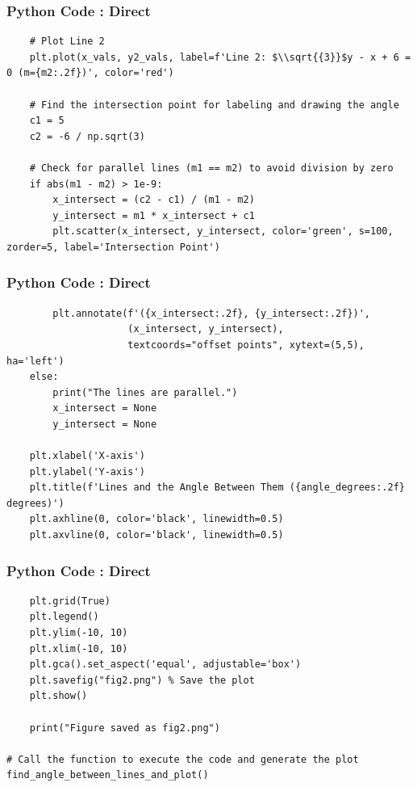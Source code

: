\documentclass{beamer}
\begin{document}
\begin{frame}[fragile]
\frametitle{Python Code : Direct}

\begin{lstlisting}
    # Plot Line 2
    plt.plot(x_vals, y2_vals, label=f'Line 2: $\\sqrt{{3}}$y - x + 6 = 0 (m={m2:.2f})', color='red')

    # Find the intersection point for labeling and drawing the angle
    c1 = 5
    c2 = -6 / np.sqrt(3)
    
    # Check for parallel lines (m1 == m2) to avoid division by zero
    if abs(m1 - m2) > 1e-9: 
        x_intersect = (c2 - c1) / (m1 - m2)
        y_intersect = m1 * x_intersect + c1
        plt.scatter(x_intersect, y_intersect, color='green', s=100, zorder=5, label='Intersection Point')
        \end{lstlisting}

\end{frame}
\begin{frame}[fragile]
\frametitle{Python Code : Direct}

\begin{lstlisting}
        plt.annotate(f'({x_intersect:.2f}, {y_intersect:.2f})', 
                     (x_intersect, y_intersect), 
                     textcoords="offset points", xytext=(5,5), ha='left')
    else:
        print("The lines are parallel.")
        x_intersect = None
        y_intersect = None

    plt.xlabel('X-axis')
    plt.ylabel('Y-axis')
    plt.title(f'Lines and the Angle Between Them ({angle_degrees:.2f} degrees)')
    plt.axhline(0, color='black', linewidth=0.5)
    plt.axvline(0, color='black', linewidth=0.5)
    \end{lstlisting}

\end{frame}
\begin{frame}[fragile]
\frametitle{Python Code : Direct}

\begin{lstlisting}
    plt.grid(True)
    plt.legend()
    plt.ylim(-10, 10)
    plt.xlim(-10, 10)
    plt.gca().set_aspect('equal', adjustable='box')
    plt.savefig("fig2.png") % Save the plot
    plt.show()

    print("Figure saved as fig2.png")

# Call the function to execute the code and generate the plot
find_angle_between_lines_and_plot()
\end{lstlisting}
\end{frame}
\end{document}
